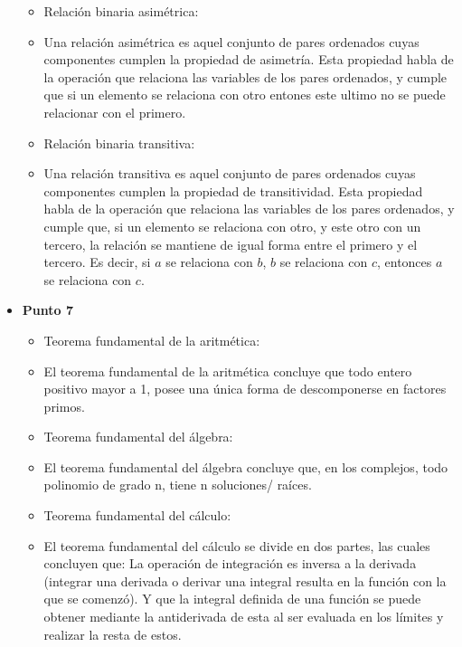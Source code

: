 \documentclass{article}
\begin{document}
\begin{itemize}
\begin{itemize}
		      \item Relación binaria asimétrica:
		      \item [] Una relación asimétrica es aquel conjunto de pares ordenados cuyas componentes cumplen la propiedad de asimetría. Esta propiedad habla de la operación que relaciona las variables de los pares ordenados, y cumple que si un elemento se relaciona con otro entones este ultimo no se puede relacionar con el primero.
		      \item Relación binaria transitiva:
		      \item [] Una relación transitiva es aquel conjunto de pares ordenados cuyas componentes cumplen la propiedad de transitividad. Esta propiedad habla de la operación que relaciona las variables de los pares ordenados, y cumple que, si un elemento se relaciona con otro, y este otro con un tercero, la relación se mantiene de igual forma entre el primero y el tercero. Es decir, si $a$ se relaciona con $b$, $b$ se relaciona con $c$, entonces $a$ se relaciona con $c$.
	      \end{itemize}
	\item [] \textbf{Punto 7}
	      \begin{itemize}
		      \item Teorema fundamental de la aritmética:
		      \item [] El teorema fundamental de la aritmética concluye que todo entero positivo mayor a 1, posee una única forma de descomponerse en factores primos.
		      \item Teorema fundamental del álgebra:
		      \item [] El teorema fundamental del álgebra concluye que, en los complejos, todo polinomio de grado n, tiene n soluciones/ raíces.
		      \item Teorema fundamental del cálculo:
		      \item [] El teorema fundamental del cálculo se divide en dos partes, las cuales concluyen que: La operación de integración es inversa a la derivada (integrar una derivada o derivar una integral resulta en la función con la que se comenzó). Y que la integral definida de una función se puede obtener mediante la antiderivada de esta al ser evaluada en los límites y realizar la resta de estos.
	      \end{itemize}
\end{itemize}
\end{document}
